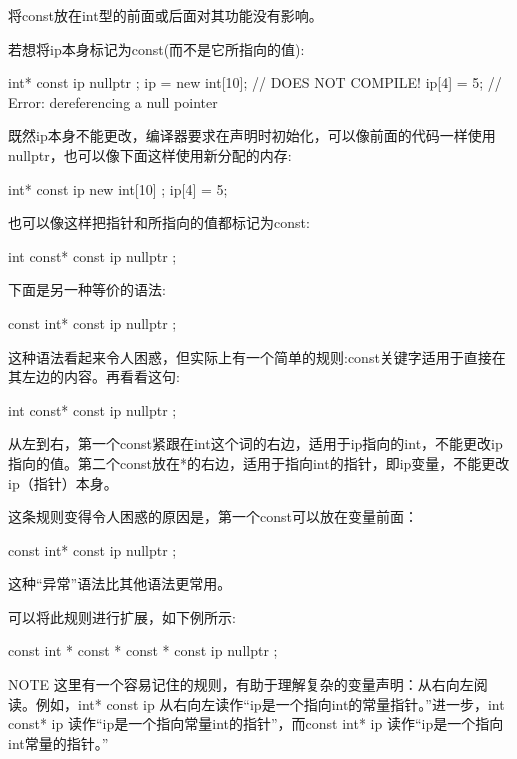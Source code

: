 将const放在int型的前面或后面对其功能没有影响。

若想将ip本身标记为const(而不是它所指向的值):

\begin{cpp}
int* const ip { nullptr };
ip = new int[10]; // DOES NOT COMPILE!
ip[4] = 5; // Error: dereferencing a null pointer
\end{cpp}

既然ip本身不能更改，编译器要求在声明时初始化，可以像前面的代码一样使用nullptr，也可以像下面这样使用新分配的内存:

\begin{cpp}
int* const ip { new int[10] };
ip[4] = 5;
\end{cpp}

也可以像这样把指针和所指向的值都标记为const:

\begin{cpp}
int const* const ip { nullptr };
\end{cpp}

下面是另一种等价的语法:

\begin{cpp}
const int* const ip { nullptr };
\end{cpp}

这种语法看起来令人困惑，但实际上有一个简单的规则:const关键字适用于直接在其左边的内容。再看看这句:

\begin{cpp}
int const* const ip { nullptr };
\end{cpp}

从左到右，第一个const紧跟在int这个词的右边，适用于ip指向的int，不能更改ip指向的值。第二个const放在*的右边，适用于指向int的指针，即ip变量，不能更改ip（指针）本身。

这条规则变得令人困惑的原因是，第一个const可以放在变量前面：

\begin{cpp}
const int* const ip { nullptr };
\end{cpp}

这种“异常”语法比其他语法更常用。

可以将此规则进行扩展，如下例所示:

\begin{cpp}
const int * const * const * const ip { nullptr };
\end{cpp}

\begin{myNotic}{NOTE}
这里有一个容易记住的规则，有助于理解复杂的变量声明：从右向左阅读。例如，int* const ip 从右向左读作“ip是一个指向int的常量指针。”进一步，int const* ip 读作“ip是一个指向常量int的指针”，而const int* ip 读作“ip是一个指向int常量的指针。”
\end{myNotic}

